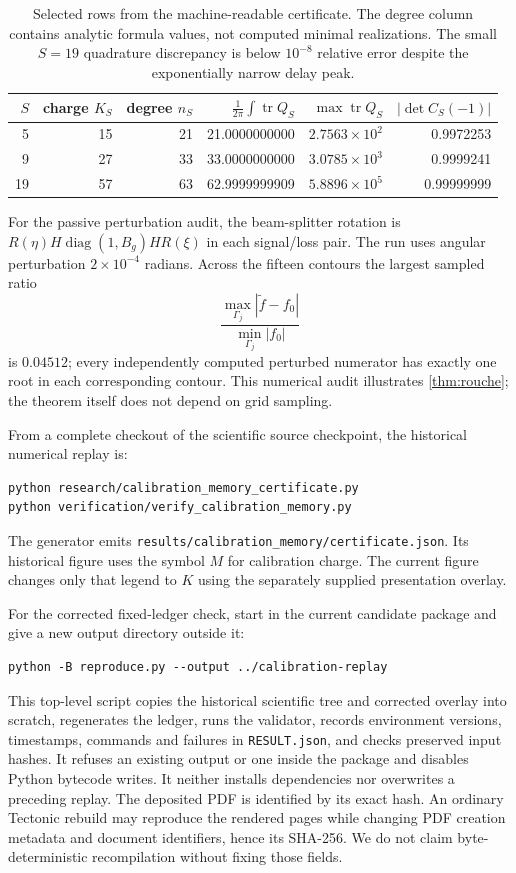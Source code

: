 \documentclass[11pt]{article}
\theoremstyle{definition}
\theoremstyle{remark}
\newcommand{\diag}{\operatorname{diag}}
\newcommand{\tr}{\operatorname{tr}}
\begin{document}
\begin{table}[htbp]
\centering
\small
\begin{tabular}{@{}rrrrrr@{}}
\toprule
$S$ & charge $K_S$ & degree $n_S$ & $\frac1{2\pi}\int\tr Q_S$
& $\max\tr Q_S$ & $|\det C_S(-1)|$\\
\midrule
5  & 15 & 21 & 21.0000000000 & $2.7563\times10^2$ & 0.9972253\\
9  & 27 & 33 & 33.0000000000 & $3.0785\times10^3$ & 0.9999241\\
19 & 57 & 63 & 62.9999999909 & $5.8896\times10^5$ & 0.99999999\\
\bottomrule
\end{tabular}
\caption{Selected rows from the machine-readable certificate. The degree
column contains analytic formula values, not computed minimal realizations. The small
$S=19$ quadrature discrepancy is below $10^{-8}$ relative error despite the
exponentially narrow delay peak.}
\label{tab:audit}
\end{table}

For the passive perturbation audit, the beam-splitter rotation is
$R(\eta)H\diag(1,B_g)HR(\xi)$ in each signal/loss pair.  The run uses angular
perturbation $2\times10^{-4}$ radians.  Across the fifteen contours the
largest sampled ratio
\begin{equation}\label{eq:rouchenumeric}
 \frac{\max_{\Gamma_j}|\widetilde f-f_0|}
 {\min_{\Gamma_j}|f_0|}
\end{equation}
is $0.04512$; every independently computed perturbed numerator has exactly
one root in each corresponding contour.  This numerical audit illustrates
\cref{thm:rouche}; the theorem itself does not depend on grid sampling.

From a complete checkout of the scientific source checkpoint, the historical
numerical replay is:
\begin{verbatim}
python research/calibration_memory_certificate.py
python verification/verify_calibration_memory.py
\end{verbatim}
The generator emits
\texttt{results/calibration\_memory/certificate.json}. Its historical figure
uses the symbol $M$ for calibration charge. The current figure changes only
that legend to $K$ using the separately supplied presentation overlay.

For the corrected fixed-ledger check, start in the current candidate package
and give a new output directory outside it:
\begin{verbatim}
python -B reproduce.py --output ../calibration-replay
\end{verbatim}
This top-level script copies the historical scientific tree and corrected
overlay into scratch, regenerates the ledger, runs the validator, records
environment versions, timestamps, commands and failures in \texttt{RESULT.json},
and checks preserved input hashes. It refuses an existing output or one
inside the package and disables Python bytecode writes. It neither installs
dependencies nor overwrites a preceding replay.
The deposited PDF is identified by its exact hash. An ordinary Tectonic
rebuild may reproduce the rendered pages while changing PDF creation
metadata and document identifiers, hence its SHA-256. We do not claim
byte-deterministic recompilation without fixing those fields.
\end{document}
